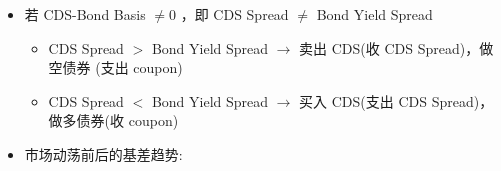 \begin{itemize}
\begin{itemize}
\begin{itemize}
CDS 的偿付未包括交付债券的累计利息（interest）。【CDS 少考虑了一部分 “好处 accrued interest” \(\rightarrow\) CDS 不值钱 \(\rightarrow\) CDS Spread \(\downarrow\) 】

 \item Positive direction， 即 CDS Spread > Bond Yield Spread

 There is a cheapest-to-deliver bond option in a CDS. 【这个 option 对于 CDS 是好的 \(\rightarrow\) CDS 更值钱 \(\rightarrow\) CDS Spread [1]

 The restructuring clause(重组条款) in a CDS contract may lead to a payoff when there is no default. 【restructuring clause 对于 CDS 是好的 \(\rightarrow\) CDS 更值钱 \(\rightarrow\) CDS Spread \(\uparrow\) 】

重组条款(Restructuring Clause)是 CDS 合约中的一项条款， 规定如果参考实体的债务发生某种形式的重组 (如修改偿还条件、 延长债务期限或降低利率等)，即使参考实体没有违约， CDS 买方也可以获得赔付。

\item 可能 Negative direction， 也可能 Positive direction

\begin{itemize}
\item 债券的售价可能与面值相差很大。

高于面值的债券价格往往会产生负基差。

低于面值的债券价格往往会产生正基差

\item 【无风险利率的选择不同】

债券收益率利差可能是相对于无风险参考利率计算的，而这个参考利率并不是市场上使用的利率。
\end{itemize}

\end{itemize}

\item 若 CDS-Bond Basis \(\neq  0\) ，即 CDS Spread \(\neq\) Bond Yield Spread
\begin{itemize}

    \item CDS Spread \(>\) Bond Yield Spread \(\rightarrow\) 卖出 CDS(收 CDS Spread)，做空债券 (支出 coupon)

    \item CDS Spread \(<\) Bond Yield Spread \(\rightarrow\) 买入 CDS(支出 CDS Spread)，做多债券(收 coupon)
\end{itemize}

 \item 市场动荡前后的基差趋势:


\end{itemize}
\end{itemize}
